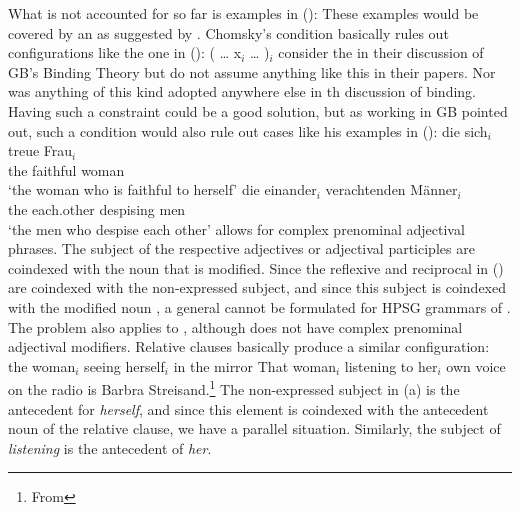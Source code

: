 \documentclass[output=paper,biblatex,babelshorthands,newtxmath,draftmode,colorlinks,citecolor=brown]{langscibook}
\begin{document}
What is not accounted for so far is  examples in ():
\eal
{}
\zl
These examples would be covered by an \iwithinic{} as suggested by
\citet[]{Chomsky81a}. Chomsky's condition basically rules out configurations like the one
in ():
\ea
( \ldots{} x$_i$ \ldots{} )$_i$
\z
\citet[]{ps2} consider the \iwithinic in their discussion of GB's Binding Theory but do not
assume anything like this in their papers. Nor was anything of this kind adopted anywhere else in
th discussion of binding. Having such a constraint could be a good solution, but as
\citet[]{Fanselow86a} working in GB pointed out, such a condition would also rule out cases like his examples in ():
\eal
\ex
\gll die sich$_i$ treue Frau$_i$\\
     the \self{} faithful woman\\
\glt `the woman who is faithful to herself'
\ex 
\gll die einander$_i$ verachtenden Männer$_i$\\
     the each.other   despising    men\\
\glt `the men who despise each other'
\zl
{} allows for complex prenominal adjectival phrases. The subject of the respective adjectives or
adjectival participles are coindexed with the noun that is modified. Since the reflexive and
reciprocal in () are coindexed with the non-expressed subject, and since this subject is
coindexed with the modified noun \citep[Section~3.2.7]{Mueller2002b}, a general \iwithinic cannot be formulated for HPSG
grammars of . The problem also applies to , although  does not have complex
prenominal adjectival modifiers. Relative clauses basically produce a similar configuration:
\ealnoraggedright
\ex the woman$_i$ seeing herself$_i$ in the mirror
\ex {}That woman$_i$ listening to her$_i$ own voice on the radio is Barbra Strei\-sand.\footnote{
From 
}
\zl
The non-expressed subject in (a) is the antecedent for \emph{herself}, and since this element
is coindexed with the antecedent noun of the relative clause, we have a parallel
situation. Similarly, the subject of \emph{listening} is the antecedent of \emph{her}.
\end{document}
